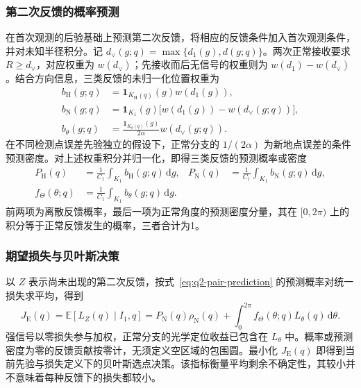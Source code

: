 \documentclass[UTF8,a4paper,zihao=-4,fontset=none]{ctexart}
\begin{document}
\subsubsection{第二次反馈的概率预测}

在首次观测的后验基础上预测第二次反馈，将相应的反馈条件加入首次观测条件，并对未知半径积分。记 \(d_\vee(g;q)=\max\{d_1(g),d(g;q)\}\)。两次正常接收要求 \(R\ge d_\vee\)，对应权重为 \(w(d_\vee)\)；先接收而后无信号的权重则为 \(w(d_1)-w(d_\vee)\)。结合方向信息，三类反馈的未归一化位置权重为
\begin{equation}
\begin{aligned}
 b_{\mathrm H}(g;q)&=\mathbf1_{K_{\mathrm H}(q)}(g)w(d_1(g)),\\
 b_{\mathrm N}(g;q)&=\mathbf1_{K_1}(g)\bigl[w(d_1(g))-w(d_\vee(g;q))\bigr],\\
 b_\theta(g;q)&=\frac{\mathbf1_{K_\theta(q)}(g)}{2\alpha}w(d_\vee(g;q)).
\end{aligned}
\label{eq:q2-pair-feedback-weights}
\end{equation}
在不同检测点误差先验独立的假设下，正常分支的 \(1/(2\alpha)\) 为新地点误差的条件预测密度。对上述权重积分并归一化，即得三类反馈的预测概率或密度
\begin{equation}
\begin{aligned}
 P_{\mathrm H}(q)&=\frac{1}{C_1}\int_{K_1}b_{\mathrm H}(g;q)\,\mathrm dg,
 &P_{\mathrm N}(q)&=\frac{1}{C_1}\int_{K_1}b_{\mathrm N}(g;q)\,\mathrm dg,\\
 f_\Theta(\theta;q)&=\frac{1}{C_1}\int_{K_1}b_\theta(g;q)\,\mathrm dg.
\end{aligned}
\label{eq:q2-pair-prediction}
\end{equation}
前两项为离散反馈概率，最后一项为正常角度的预测密度分量，其在 \([0,2\pi)\) 上的积分等于正常反馈发生的概率，三者合计为1。

\subsubsection{期望损失与贝叶斯决策}

以 \(Z\) 表示尚未出现的第二次反馈，按式~\eqref{eq:q2-pair-prediction} 的预测概率对统一损失求平均，得到
\begin{equation}
 J_{\mathrm E}(q)=\mathbb E[L_Z(q)\mid I_1,q]
 =P_{\mathrm N}(q)\rho_{\mathrm N}(q)
 +\int_0^{2\pi}f_\Theta(\theta;q)L_\theta(q)\,\mathrm d\theta.
\label{eq:q2-pair-expected-objective}
\end{equation}
强信号以零损失参与加权，正常分支的光学定位收益已包含在 \(L_\theta\) 中。概率或预测密度为零的反馈贡献按零计，无须定义空区域的包围圆。最小化 \(J_{\mathrm E}(q)\) 即得到当前先验与损失定义下的贝叶斯选点决策。该指标衡量平均剩余不确定性，其较小并不意味着每种反馈下的损失都较小。
\end{document}
